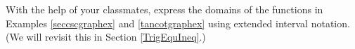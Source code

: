 {With the help of your classmates, express the domains of the functions in Examples \ref{seccscgraphex} and \ref{tancotgraphex} using extended interval notation. (We will revisit this in Section \ref{TrigEquIneq}.)  }
{}
